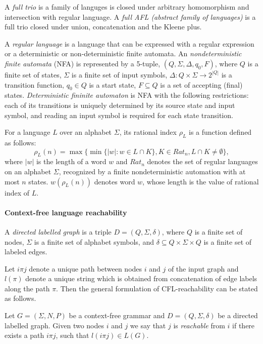 A \textit{full trio} is a family of languges is closed under arbitrary homomorphism and intersection with regular language. A \textit{full AFL (abstract family of languages)} is a full trio closed under union, concatenation and the Kleene plus. 


A \textit{regular language} is a language that can be expressed with a regular expression or a deterministic or non-deterministic finite automata.
An \textit{nondeterministic finite automata} (NFA) is represented by a 5-tuple, $(Q,\Sigma ,\Delta ,q_{0},F)$, where $Q$ is a finite set of states, $\Sigma$ is a finite set of input symbols, $\Delta:Q\times \Sigma \rightarrow 2^{|Q|}$ is a transition function, $q_0 \in Q$ is a start state, $F \subseteq Q$ is a set of accepting (final) states. \textit{Deterministic fininite automaton} is NFA with the following restrictions: each of its transitions is uniquely determined by its source state and input symbol, and reading an input symbol is required for each state transition.


 For a language $L$ over an alphabet $\Sigma$, its rational index $\rho_L$ is a function defined as follows:
\begin{equation}
\rho_L(n) = \max\{\min\{|w|:w \in L \cap K\}, K \in {Rat}_n, L \cap K \neq \emptyset\},
\end{equation} where $|w|$ is the length of a word $w$ and ${Rat}_n$ denotes the set of regular languages on an alphabet $\Sigma$, recognized by a finite nondeterministic automation with at most $n$ states. $w(\rho_L(n))$ denotes word $w$, whose length is the value of rational index of $L$.
\paragraph{Context-free language reachability} 
A \textit{directed labelled graph} is a triple $D = (Q, \Sigma, \delta)$, where $Q$ is a finite set of nodes, $\Sigma$ is a finite set of alphabet symbols,
and $\delta \subseteq Q \times \Sigma \times Q$ is a finite set of labeled edges. 


Let $i\pi j$ denote a unique path between nodes $i$ and $j$ of the input graph and $l(\pi)$ denote a unique string which is obtained from concatenation of edge labels along the path $\pi$. Then the general formulation of CFL-reachability can be stated as follows.
\begin{definition}
Let $G = (\Sigma, N, P)$ be a context-free grammar and $D = (Q, \Sigma, \delta)$ be a directed labelled graph. Given two nodes $i$ and $j$ we say that $j$ is \textit{reachable} from $i$ if there exists a path $i \pi j$, such that $l(i \pi j) \in L(G)$. 
\end{definition}


